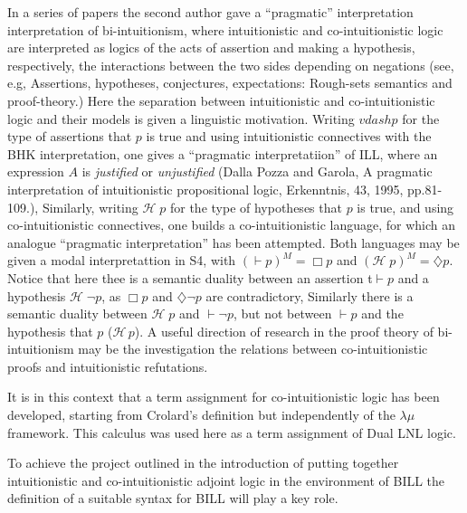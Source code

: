 In a series of papers the second author gave a ``pragmatic''
interpretation interpretation of bi-intuitionism, where intuitionistic
and co-intuitionistic logic are interpreted as logics of the acts of
assertion and making a hypothesis, respectively, the interactions
between the two sides depending on negations (see, e.g,
\cite{Bellin:2014} Assertions, hypotheses, conjectures, expectations:
Rough-sets semantics and proof-theory.)  Here the separation between 
intuitionistic and co-intuitionistic logic and their models is given a 
linguistic motivation. Writing  $vdash p$ for the type of assertions that $p$ 
is true and using intuitionistic connectives with the BHK interpretation, one gives 
a ``pragmatic interpretatiion'' of ILL, where an expression $A$ is \emph{justified} 
or \emph{unjustified} (Dalla Pozza and Garola,  
A pragmatic interpretation of intuitionistic propositional logic, Erkenntnis, 43, 1995, pp.81-109.), 
Similarly, writing $\mathcal{H}\;  p$ for the type of hypotheses that $p$ is true,  and  
using co-intuitionistic connectives, one builds a co-intuitionistic language, for which 
an analogue ``pragmatic interpretation'' has been attempted.  Both languages may 
be given a modal interpretattion in S4, with $(\vdash p)^M = \Box p$
and  $(\mathcal{H}\;  p)^M = \diamondsuit p$. Notice that  here thee is a semantic duality between
an assertion t$\vdash p$  and a hypothesis $\mathcal{H}\; \neg p$, as $\Box p$ and 
$\diamondsuit \neg p$ are contradictory, Similarly there is a semantic duality between 
$\mathcal{H}\;  p$ and $\vdash \neg p$, but not between $\vdash p$ 
and the hypothesis that $p$ ($\mathcal{H}\, p$). A useful direction of research in the 
proof theory of bi-intuitionism may be the investigation the relations between co-intuitionistic
proofs and intuitionistic refutations. 

It is in this context that a term assignment for co-intuitionistic  logic 
has been developed, starting from Crolard's definition but independently
of the $\lambda\mu$ framework. This calculus was used
here as a term assignment of Dual LNL logic.


To achieve the project outlined in the introduction of putting
together intuitionistic and co-intuitionistic adjoint logic in the
environment of BILL the definition of a suitable syntax for BILL will
play a key role.



